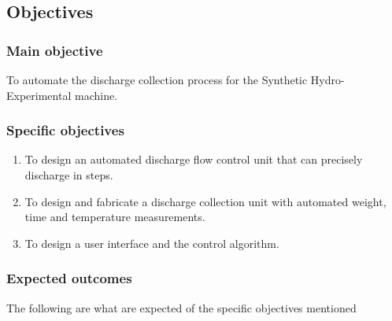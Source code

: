 \subsection{Objectives}
\subsubsection{Main objective}

 To automate the discharge collection process for the Synthetic Hydro-Experimental machine. 

\subsubsection{Specific objectives}

\begin{enumerate}
	\item To design an automated discharge flow control unit that can precisely discharge in steps.
	\item To design and fabricate a discharge collection unit with automated weight, time and temperature measurements.
    \item To design a user interface and the control algorithm.

\end{enumerate}

\subsubsection{Expected outcomes}
The following are what are expected of the specific objectives mentioned

